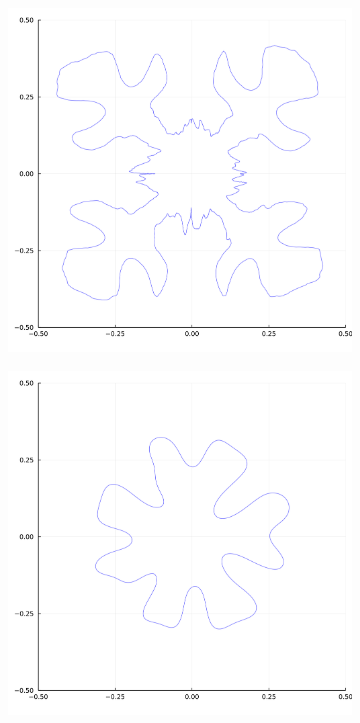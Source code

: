 \begin{figure}[h!]
	\begin{subfigure}{0.4\textwidth}
		\centering
		\includegraphics[width=\textwidth]{images/elastic_neighbourhood/fig_space_filling_static}
		\caption{}
	\end{subfigure}
	\begin{subfigure}{0.4\textwidth}
		\centering
		\includegraphics[width=\textwidth]{images/elastic_neighbourhood/fig_space_filling_full_iterations}

\end{subfigure}
\end{figure}

